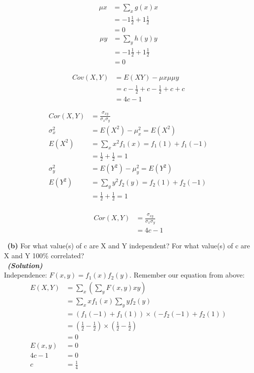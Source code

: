 \documentclass[a4 paper]{article}
\numberwithin{equation}{section}
\newcommand{\subproblem}[1]{~\newline\textbf{(#1)}}
\newcommand{\solution}{~\newline\textbf{\textit{(Solution)}} }
\newcommand{\0}{\mathbf{0}}
\begin{document}
\begin{align*}
    \mu x &= \sum_{x}g(x)x \\
    &= -1 \frac{1}{2} + 1\frac{1}{2} \\
    &= 0
\end{align*}{}
\begin{align*}
    \mu y &= \sum_{y}h(y)y \\
    &= -1 \frac{1}{2} + 1\frac{1}{2} \\
    &= 0
\end{align*}{}

\begin{align*}
    Cov(X,Y) &= E(XY ) - \mu x μ \mu y \\
    &= c - \frac{1}{2} + c - \frac{1}{2} + c + c\\
    &= 4c-1
\end{align*}{}

\begin{align*}
    Cor(X,Y) &= \frac{\sigma_{xy}}{\sigma_x \sigma_y}\\
    \sigma_x^2 &= E(X^2) - \mu_x^2 = E(X^2) \\
    E(X^2) &= \sum_{x}x^2f_1(x) = f_1(1) + f_1(-1) \\
    &= \frac{1}{2} + \frac{1}{2} = 1 \\
    \sigma_y^2 &= E(Y^2) - \mu_y^2 = E(Y^2) \\
    E(Y^2) &= \sum_{y}y^2f_2(y) = f_2(1) + f_2(-1) \\
    &= \frac{1}{2} + \frac{1}{2} = 1 \\
\end{align*}{}

\begin{align*}
    Cor(X,Y) &= \frac{\sigma_{xy}}{\sigma_x \sigma_y}\\
    &= 4c-1
\end{align*}{}


\newline
\subproblem{b} For what value(s) of c are X and Y independent? For what value(s) of c are X and Y 100\% correlated?\\
\solution\\
Independence: $F (x, y) = f_1(x)f_2(y)$. Remember our equation from above:
\begin{align*}
   E(X, Y) &=  \sum_{x}(\sum_{y}F(x, y)xy) \\
   &= \sum_{x}xf_1(x)\sum_{y}yf_2(y) \\
   &= (f_1(-1) + f_1(1)) \times ( −f_2(-1) + f_2(1)) \\
   &= (\frac{1}{2} - \frac{1}{2}) \times (\frac{1}{2} - \frac{1}{2}) \\
   &= 0 \\
   E(x, y) &= 0 \\
   4c - 1 &= 0 \\
   c &= \frac{1}{4} 
\end{align*}{}
\end{document}
